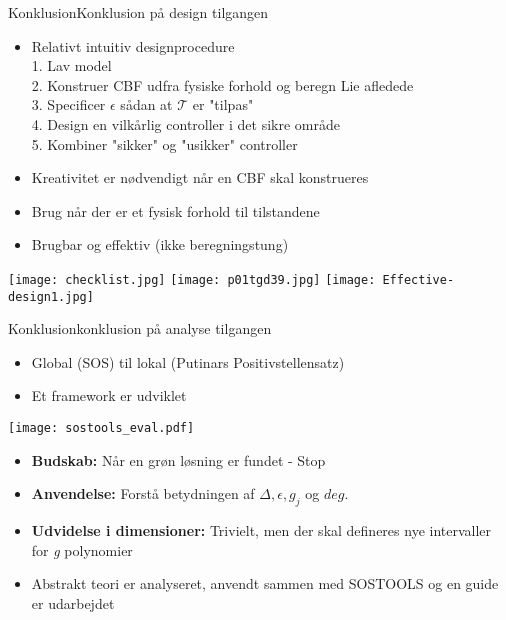 \begin{frame}{Konklusion}{Konklusion på design tilgangen}
\begin{itemize}
	\item Relativt intuitiv designprocedure \\	\vspace*{0.08cm}
	\scriptsize {\color{white}{m}} 1. Lav model \\	
    \scriptsize {\color{white}{m}} 2. Konstruer CBF udfra fysiske forhold og beregn Lie afledede\\	
    \scriptsize {\color{white}{m}} 3. Specificer $\epsilon$ sådan at $\mathcal{T}$ er "tilpas" \\	
    \scriptsize {\color{white}{m}} 4. Design en vilkårlig controller i det sikre område \\ 	
    \scriptsize {\color{white}{m}} 5. Kombiner "sikker" og "usikker" controller \\
	\item \normalsize Kreativitet er nødvendigt når en CBF skal konstrueres
	\item Brug når der er et fysisk forhold til tilstandene
	\item Brugbar og effektiv (ikke beregningstung)
\end{itemize}
\vspace*{0.2cm}
\texttt{[image: checklist.jpg]} \hspace*{0.2cm}
\texttt{[image: p01tgd39.jpg]} \hspace*{0.2cm}
\texttt{[image: Effective-design1.jpg]}
\end{frame}



\begin{frame}{Konklusion}{konklusion på analyse tilgangen}
\begin{itemize}
	\item Global (SOS) til lokal (Putinars Positivstellensatz)
	\item Et framework er udviklet
\end{itemize}

\texttt{[image: sostools\_eval.pdf]}

\begin{itemize}
	\item \textbf{Budskab:} Når en grøn løsning er fundet - Stop
	\item \textbf{Anvendelse:} Forstå betydningen af $\Delta, \epsilon, g_j$ og $deg$.
	\item \textbf{Udvidelse i dimensioner:} Trivielt, men der skal defineres nye intervaller for \textit{g} polynomier 
	\item Abstrakt teori er analyseret, anvendt sammen med SOSTOOLS og en guide er udarbejdet
\end{itemize}

\end{frame}

